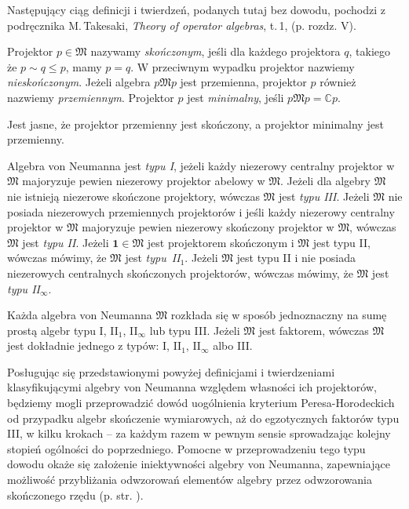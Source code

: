 Następujący ciąg definicji i twierdzeń, podanych tutaj bez dowodu,
pochodzi z podręcznika M.\,Takesaki, \emph{Theory of operator algebras}, t.\,1,
\cite{Takesaki1} (p. rozdz. V).

\begin{Definition}
    \label{def:projectionsInvN}
    Projektor $p \in \mathfrak{M}$ nazywamy \emph{skończonym}, jeśli
    dla każdego projektora $q$, takiego że $p \sim q \leq p$, mamy $p = q$.
    W przeciwnym wypadku projektor nazwiemy \emph{nieskończonym}.
    Jeżeli algebra $p \mathfrak{M} p$ jest przemienna,
    projektor $p$ również nazwiemy \emph{przemiennym}.
    Projektor $p$ jest \emph{minimalny}, jeśli $p \mathfrak{M} p = \mathbb{C} p$.
\end{Definition}

Jest jasne, że projektor przemienny jest skończony, a projektor minimalny jest przemienny.

\begin{Definition}
    \label{def:typesofvNalg}
    Algebra von Neumanna jest \emph{typu I}, jeżeli każdy niezerowy centralny
    projektor w $\mathfrak{M}$ majoryzuje pewien niezerowy projektor abelowy
    w $\mathfrak{M}$.
    Jeżeli dla algebry $\mathfrak{M}$ nie istnieją niezerowe skończone projektory,
    wówczas $\mathfrak{M}$ jest \emph{typu III}.
    Jeżeli $\mathfrak{M}$ nie posiada niezerowych przemiennych projektorów
    i jeśli każdy niezerowy centralny projektor w $\mathfrak{M}$ majoryzuje
    pewien niezerowy skończony projektor w $\mathfrak{M}$, wówczas
    $\mathfrak{M}$ jest \emph{typu II}.
    Jeżeli $\mathbf{1} \in \mathfrak{M}$ jest projektorem skończonym i
    $\mathfrak{M}$ jest typu II, wówczas mówimy, że $\mathfrak{M}$ jest
    \mbox{\emph{typu II$_{1}$}}.
    Jeżeli $\mathfrak{M}$ jest typu II i nie posiada niezerowych centralnych skończonych
    projektorów, wówczas mówimy, że $\mathfrak{M}$ jest \emph{typu II$_{\infty}$}.
\end{Definition}

\begin{Theorem}
    \label{thm:decompositionofvNalg}
    Każda algebra von Neumanna $\mathfrak{M}$ rozkłada się w sposób
    jednoznaczny na sumę prostą algebr typu I, II$_{1}$, II$_{\infty}$ lub typu III.
    Jeżeli $\mathfrak{M}$ jest faktorem, wówczas $\mathfrak{M}$ jest dokładnie
    jednego z typów: I, II$_{1}$, II$_{\infty}$ albo III.
\end{Theorem}

Posługując się przedstawionymi powyżej definicjami i twierdzeniami klasyfikującymi
algebry von Neumanna
względem własności ich projektorów,
będziemy mogli przeprowadzić dowód uogólnienia kryterium Peresa-Horodeckich
od przypadku algebr skończenie wymiarowych,
aż do egzotycznych faktorów typu III,
w kilku krokach -- za każdym razem w pewnym sensie
sprowadzając kolejny stopień ogólności do poprzedniego.
Pomocne w przeprowadzeniu tego typu dowodu okaże się założenie iniektywności
algebry von Neumanna, zapewniające możliwość przybliżania odwzorowań
elementów algebry przez odwzorowania skończonego rzędu
(p. str. \pageref{def:injectivevNalg}).

